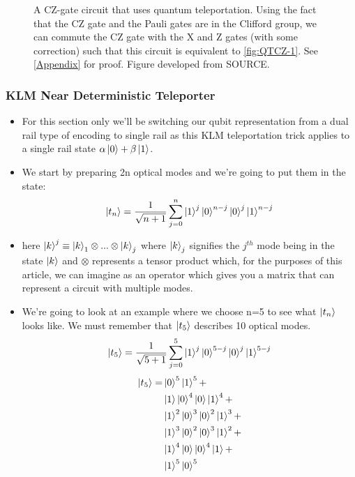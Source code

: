 \begin{figure}[!h]
\begin{tikzpicture}[x=0.75pt,y=0.75pt,yscale=-1,xscale=1]
\end{tikzpicture}


 \caption{A CZ-gate circuit that uses quantum teleportation. Using the fact that the CZ gate and the Pauli gates are in the Clifford group, we can commute the CZ gate with the X and Z gates (with some correction) such that this circuit is equivalent to \ref{fig:QTCZ-1}. See \ref{Appendix} for proof. Figure developed from SOURCE. }
    \label{fig:QTCZ-2}
\end{figure}

\subsubsection{KLM Near Deterministic Teleporter}
\begin{itemize}
    \item For this section only we'll be switching our qubit representation from a dual rail type of encoding to single rail as this KLM teleportation trick applies to a single rail state $\alpha\ket{0} + \beta\ket{1}$.
    \item We start by preparing 2n optical modes and we're going to put them in the state:
    \begin{equation}
        \ket{t_n} = \frac{1}{\sqrt{n+1}}\sum\limits_{j=0}^{n}\ket{1}^j\ket{0}^{n-j}\ket{0}^j\ket{1}^{n-j}
        \label{eqn: QFT Teleporter EQ}
    \end{equation}
    \item here $\ket{k}^j \equiv \ket{k}_1 \otimes...\otimes\ket{k}_j$ where $\ket{k}_j$ signifies the $j^{th}$ mode being in the state $\ket{k}$ and $\otimes$ represents a tensor product which, for the purposes of this article, we can imagine as an operator which gives you a matrix that can represent a circuit with multiple modes. 
    \item We're going to look at an example where we choose n=5 to see what $\ket{t_n}$ looks like. We must remember that  $\ket{t_5}$ describes 10 optical modes.
    \begin{equation}
        \ket{t_5} = \frac{1}{\sqrt{5+1}}\sum\limits_{j=0}^5\ket{1}^j\ket{0}^{5-j}\ket{0}^j\ket{1}^{5-j}
    \end{equation}
    \begin{align} 
        \ket{t_5} =  & \ket{0}^{5}\ket{1}^5 
        + \\ & \ket{1}\ket{0}^{4}\ket{0}\ket{1}^{4} + 
 \\ & \ket{1}^2\ket{0}^{3}\ket{0}^2\ket{1}^{3} \label{t5:1} + \\ & \ket{1}^3\ket{0}^{2}\ket{0}^3\ket{1}^{2}\label{t5:2} + \\  & \ket{1}^4\ket{0}\ket{0}^4\ket{1} + \\ & \ket{1}^{5}\ket{0}^5  

\end{align}
\end{itemize}
